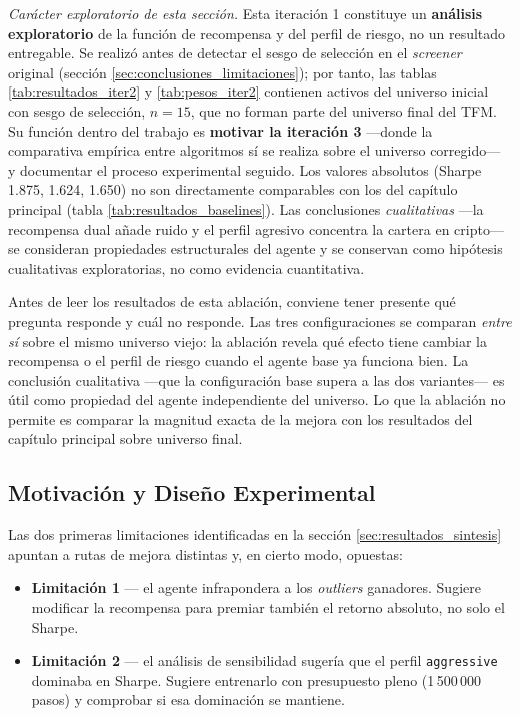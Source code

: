 \documentclass[IB,a4paper]{TFUOC}
\begin{document}
\noindent\textit{Carácter exploratorio de esta sección.} Esta iteración 1 constituye un \textbf{análisis exploratorio} de la función de recompensa y del perfil de riesgo, no un resultado entregable. Se realizó antes de detectar el sesgo de selección en el \textit{screener} original (sección \ref{sec:conclusiones_limitaciones}); por tanto, las tablas \ref{tab:resultados_iter2} y \ref{tab:pesos_iter2} contienen activos del universo inicial con sesgo de selección, $n=15$, que no forman parte del universo final del TFM. Su función dentro del trabajo es \textbf{motivar la iteración 3} ---donde la comparativa empírica entre algoritmos sí se realiza sobre el universo corregido--- y documentar el proceso experimental seguido. Los valores absolutos (Sharpe 1.875, 1.624, 1.650) no son directamente comparables con los del capítulo principal (tabla \ref{tab:resultados_baselines}). Las conclusiones \textit{cualitativas} ---la recompensa dual añade ruido y el perfil agresivo concentra la cartera en cripto--- se consideran propiedades estructurales del agente y se conservan como hipótesis cualitativas exploratorias, no como evidencia cuantitativa.

Antes de leer los resultados de esta ablación, conviene tener presente qué pregunta responde y cuál no responde. Las tres configuraciones se comparan \emph{entre sí} sobre el mismo universo viejo: la ablación revela qué efecto tiene cambiar la recompensa o el perfil de riesgo cuando el agente base ya funciona bien. La conclusión cualitativa —que la configuración base supera a las dos variantes— es útil como propiedad del agente independiente del universo. Lo que la ablación no permite es comparar la magnitud exacta de la mejora con los resultados del capítulo principal sobre universo final.

\subsection{Motivación y Diseño Experimental}

Las dos primeras limitaciones identificadas en la sección \ref{sec:resultados_sintesis} apuntan a rutas de mejora distintas y, en cierto modo, opuestas:

\begin{itemize}
    \item \textbf{Limitación 1} — el agente infrapondera a los \textit{outliers} ganadores. Sugiere modificar la recompensa para premiar también el retorno absoluto, no solo el Sharpe.
    \item \textbf{Limitación 2} — el análisis de sensibilidad sugería que el perfil \texttt{aggressive} dominaba en Sharpe. Sugiere entrenarlo con presupuesto pleno (1\,500\,000 pasos) y comprobar si esa dominación se mantiene.
\end{itemize}
\end{document}
